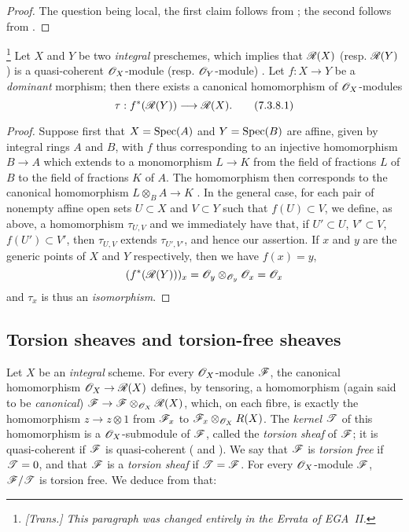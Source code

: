 \begin{proof}
\label{proof-1.7.3.7}
The question being local, the first claim follows from ; the second follows from .
\end{proof}

\begin{env}[7.3.8]
\label{1.7.3.8}
\footnote{\emph{[Trans.] This paragraph was changed entirely in the Errata of EGA~II.}}
Let $X$ and $Y$ be two \emph{integral} preschemes, which implies that $\mathscr{R}(X)$ (resp. $\mathscr{R}(Y)$) is a quasi-coherent $\mathscr{O}_X$-module (resp. $\mathscr{O}_Y$-module) .
Let $f:X\to Y$ be a \emph{dominant} morphism; then there exists a canonical homomorphism of $\mathscr{O}_X$-modules
\[
\label{1.7.3.8.1}
  \tau:f^*(\sh{R}(Y))\to\sh{R}(X).
  \tag{7.3.8.1}
\]
\end{env}

\begin{proof}
\label{proof-1.7.3.8}
Suppose first that $X=\operatorname{Spec}(A)$ and $Y=\operatorname{Spec}(B)$ are affine, given by integral rings $A$ and $B$, with $f$ thus corresponding to an injective homomorphism $B\to A$ which extends to a monomorphism $L\to K$ from the field of fractions $L$ of $B$ to the field of fractions $K$ of $A$.
The homomorphism  then corresponds to the canonical homomorphism $L\otimes_B A\to K$ .
In the general case, for each pair of nonempty affine open sets $U\subset X$ and $V\subset Y$ such that $f(U)\subset V$, we define, as above, a homomorphism $\tau_{U,V}$ and we immediately have that, if $U'\subset U$, $V'\subset V$, $f(U')\subset V'$, then $\tau_{U,V}$ extends $\tau_{U',V'}$, and hence our assertion.
If $x$ and $y$ are the generic points of $X$ and $Y$ respectively, then we have $f(x)=y$,
\[
  (f^*(\mathscr{R}(Y)))_x=\mathscr{O}_y\otimes_{\mathscr{O}_y}\mathscr{O}_x=\mathscr{O}_x
\]
 and $\tau_x$ is thus an \emph{isomorphism}.
\end{proof}

\subsection{Torsion sheaves and torsion-free sheaves}
\label{subsection:1.7.4}

\begin{env}[7.4.1]
\label{1.7.4.1}
Let $X$ be an \emph{integral} scheme.
For every $\mathscr{O}_X$-module $\mathscr{F}$, the canonical homomorphism $\sh{O}_X\to\sh{R}(X)$ defines, by tensoring, a homomorphism (again said to be \emph{canonical}) $\sh{F}\to\sh{F}\otimes_{\sh{O}_X}\sh{R}(X)$, which, on each fibre, is exactly the homomorphism $z\to z\otimes1$ from $\mathscr{F}_x$ to $\mathscr{F}_x\otimes_{\mathscr{O}_X}R(X)$.
The \emph{kernel $\mathscr{T}$} of this homomorphism is a $\mathscr{O}_X$-submodule of $\mathscr{F}$, called the \emph{torsion sheaf} of $\mathscr{F}$; it is quasi-coherent if $\mathscr{F}$ is quasi-coherent ( and ).
We say that $\mathscr{F}$ is \emph{torsion free} if $\mathscr{T}=0$, and that $\mathscr{F}$ is a \emph{torsion sheaf} if $\mathscr{T}=\mathscr{F}$.
For every $\mathscr{O}_X$-module $\mathscr{F}$, $\mathscr{F}/\mathscr{T}$ is torsion free.
We deduce from  that:
\end{env}

